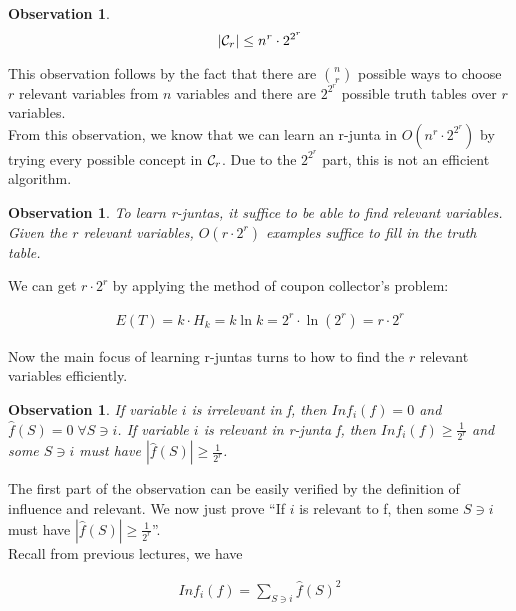 \documentclass[12pt]{article}
\newtheorem{observation}[theorem]{Observation}
\newcommand{\calc}{{\cal C}}
\begin{document}
\begin{observation}
\begin{equation*}
|\calc_r| \le n^r \cdot 2^{2^r}
\end{equation*}
\end{observation}

This observation follows by the fact that there are $\binom {n}{r}$
possible ways to choose $r$ relevant variables from $n$ variables and
there are $2^{2^r}$ possible truth tables over $r$ variables. \\

From this observation, we know that we can learn an r-junta in $O(n^r
\cdot 2^{2^r})$ by trying every possible concept in $\calc_r$. Due
to the $2^{2^r}$ part, this is not an efficient algorithm.

\begin{observation}
To learn r-juntas, it suffice to be able to find relevant
variables. Given the $r$ relevant variables, $O(r \cdot 2^r)$ examples
suffice to fill in the truth table.
\end{observation}

We can get $r \cdot 2^r$ by applying the method of coupon collector's
problem:

\begin{eqnarray*}
E(T) = k \cdot H_k = k \ln k = 2^r \cdot \ln (2^r) = r \cdot 2^r
\end{eqnarray*}

Now the main focus of learning r-juntas turns to how to find the $r$
relevant variables efficiently.

\begin{observation}
If variable $i$ is irrelevant in f, then $Inf_i(f) = 0$ and $\hat
{f}(S) = 0 \; \forall S \ni i$. If variable $i$ is relevant in r-junta
f, then $Inf_i(f) \ge \frac {1}{2^r}$ and some $S \ni i$ must have
$|\hat {f}(S)| \ge \frac {1}{2^r}$.
\end{observation}

The first part of the observation can be easily verified by the
definition of influence and relevant. We now just prove ``If $i$ is
relevant to f, then some $S \ni i$ must have $|\hat {f}(S)| \ge \frac
{1}{2^r}$''. \\

Recall from previous lectures, we have

\begin{eqnarray*}
Inf_i(f) = \sum_{S \ni i} \hat {f}(S)^2
\end{eqnarray*}
\end{document}
